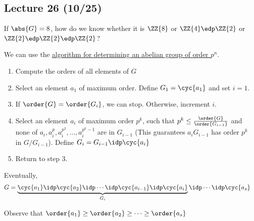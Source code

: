 \subsection*{Lecture 26 (10/25)} %

If \(\abs{G} = 8\), how do we know whether it is \(\ZZ{8}\) or \(\ZZ{4}\edp\ZZ{2}\) or \(\ZZ{2}\edp\ZZ{2}\edp\ZZ{2}\)?

We can use the \ul{algorithm for determining an abelian group of order \(p^n\)}.

\begin{enumerate}[label=Step \arabic*., left=0pt, labelsep=1em]
\item Compute the orders of all elements of \(G\)
\item Select an element \(a_1\) of maximum order. Define \(G_1=\cyc{a_1}\) and set \(i=1\).
\item If \(\order{G} = \order{G_i}\), we can stop. Otherwise, increment \(i\).
\item Select an element \(a_i\) of maximum order \(p^k\), such that \(p^k\leq \frac{\order{G}}{\order{G_{i-1}}}\) and none of \(a_i, a_i^p, a_i^{p^2}, \ldots, a_i^{p^k-1}\) are in \(G_{i-1}\) (This guarantees \(a_iG_{i-1}\) has order \(p^k\) in \(G/G_{i-1}\)). Define \(G_i = G_{i-1}\idp \cyc{a_i}\)
\item Return to step 3.
\end{enumerate}
Eventually, \begin{align*}
G=\underbrace{\cyc{a_1}\idp\cyc{a_2}\idp\cdots\idp\cyc{a_{i-1}}\idp\cyc{a_i}}_{G_i}\idp \cdots\idp\cyc{a_s}
\end{align*}
\begin{note}
Observe that \(\order{a_1}\geq \order{a_2}\geq \cdots \geq \order{a_s}\)
\end{note}

